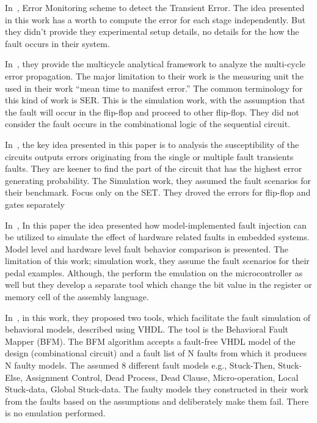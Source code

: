 In~\cite{das2007monitoring}, Error Monitoring scheme to detect the Transient Error. The idea presented in this work has a worth to compute the error for each stage
independently. But they didn't provide they experimental setup details, no details for the how the fault
occurs in their system.

In~\cite{asadi2005soft}, they provide the multicycle analytical framework to analyze the multi-cycle error
propagation. The major limitation to their work is the measuring unit the used in their work “mean time
to manifest error.” The common terminology for this kind of work is SER. This is the simulation work,
with the assumption that the fault will occur in the flip-flop and proceed to other flip-flop. They did not
consider the fault occurs in the combinational logic of the sequential circuit.

In~\cite{miskov2010multiple}, the key idea presented in this paper is to analysis the susceptibility of the circuits outputs
errors originating from the single or multiple fault transients faults. They are keener to find the part of
the circuit that has the highest error generating probability.
The Simulation work, they assumed the fault scenarios for their benchmark. Focus only on the
SET. They droved the errors for flip-flop and gates separately





In~\cite{svenningsson2010model}, In this paper the idea presented how model-implemented fault injection can be utilized to
simulate the effect of hardware related faults in embedded systems. Model level and hardware level
fault behavior comparison is presented.
The limitation of this work; simulation work, they assume the fault scenarios for their pedal examples. Although, the
perform the emulation on the microcontroller as well but they develop a separate tool which change
the bit value in the register or memory cell of the assembly language.


In~\cite{hayne1999behavioral}, in this work, they proposed two tools, which facilitate the fault simulation of behavioral
models, described using VHDL. The tool is the Behavioral Fault Mapper (BFM). The BFM algorithm
accepts a fault-free VHDL model of the design (combinational circuit) and a fault list of N faults from
which it produces N faulty models. The assumed 8 different fault models e.g., Stuck-Then, Stuck-Else,
Assignment Control, Dead Process, Dead Clause, Micro-operation, Local Stuck-data, Global Stuck-data. The faulty models they constructed in their work from the faults based on the assumptions
and deliberately make them fail. There is no emulation performed.

